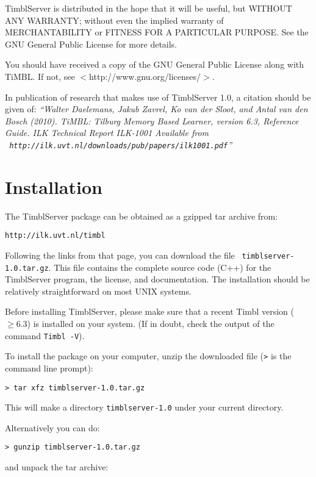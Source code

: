 \documentclass{report}
\begin{document}
TimblServer is distributed in the hope that it will be useful, but WITHOUT ANY WARRANTY; without even the implied warranty of MERCHANTABILITY or FITNESS FOR A PARTICULAR PURPOSE.  See the GNU General Public License for more details.

You should have received a copy of the GNU General Public License along with TiMBL.  If not, see $<$http://www.gnu.org/licenses/$>$.

In publication of research that makes use of TimblServer 1.0, a citation should be given of: {\em ``Walter Daelemans, Jakub Zavrel, Ko van der
  Sloot, and Antal van den Bosch (2010). TiMBL: Tilburg Memory Based
  Learner, version 6.3, Reference Guide. ILK Technical Report ILK-1001
  Available from \\ {\tt
    http://ilk.uvt.nl/downloads/pub/papers/ilk1001.pdf}''}

\pagestyle{headings}

\chapter{Installation}


\vspace{-1cm}
The TimblServer package can be obtained as a gzipped tar archive from:

{\tt http://ilk.uvt.nl/timbl}

Following the links from that page, you can download the file {\tt
  timblserver-1.0.tar.gz}. This file contains the complete source code
(C++) for the TimblServer program, the license, and documentation. The
installation should be relatively straightforward on most UNIX
systems.

Before installing TimblServer, please make sure that a recent Timbl
version ($\geq 6.3$) is installed on your system. (If in doubt, check
the output of the command {\tt Timbl -V}).

To install the package on your computer, unzip the downloaded file ({\tt >} is the command line prompt):

{\tt > tar xfz timblserver-1.0.tar.gz}

This will make a directory {\tt timblserver-1.0} under your current directory.

Alternatively you can do:

{\tt > gunzip timblserver-1.0.tar.gz}

and unpack the tar archive:
\end{document}
